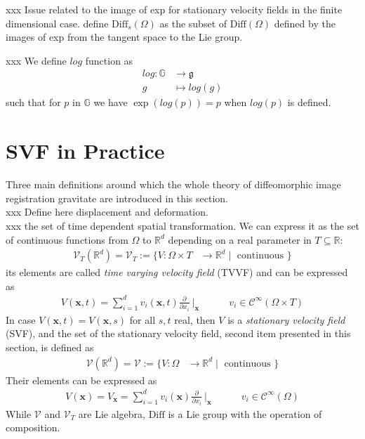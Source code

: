 xxx Issue related to the image of exp for stationary velocity fields in the finite dimensional case. define $\text{Diff}_{s}(\Omega)$ as the subset of $\text{Diff}(\Omega)$ defined by the images of exp from the tangent space to the Lie group.


xxx We define $log$ function as
\begin{align*}
log : \mathbb{G} & \longrightarrow  \mathfrak{g}    \\
g &\longmapsto log(g)
\end{align*}
such that for $p$ in $\mathbb{G}$ we have $\exp(log(p)) = p$ when $log(p)$ is defined.



\section{SVF in Practice}

Three main definitions around which the whole theory of diffeomorphic image registration gravitate are introduced in this section. \\
xxx Define here displacement and deformation.\\
xxx the set of time dependent spatial transformation. We can express it as the set of continuous functions from $\Omega$ to $\mathbb{R}^{d}$ depending on a real parameter in $T\subseteq \mathbb{R}$:
\begin{align*}
\mathcal{V}_{T}(\mathbb{R}^{d}) = \mathcal{V}_{T} := \lbrace V : \Omega \times T &\longrightarrow \mathbb{R}^d \mid \text{ continuous } \rbrace 
\end{align*}
its elements are called \emph{time varying velocity field} (TVVF) and can be expressed as
\begin{align*}
V(\mathbf{x},t) = \sum_{i=1}^{d} v_{i}(\mathbf{x},t) \frac{\partial}{\partial x_{i}}~\Bigr|_{\mathbf{x}} 
\qquad 
\quad 
v_{i} \in \mathcal{C}^{\infty} (\Omega \times T)
\end{align*}
In case $V(\mathbf{x},t) = V(\mathbf{x},s)$ for all $s,t$ real, then $V$ is a \emph{stationary velocity field} (SVF), and the set of the stationary velocity field, second item presented in this section, is defined as
\begin{align*}
\mathcal{V}(\mathbb{R}^{d}) = \mathcal{V} := \lbrace V : \Omega &\longrightarrow \mathbb{R}^d \mid \text{ continuous } \rbrace 
\end{align*}
Their elements can be expressed as 
\begin{align*}
V(\mathbf{x}) = V_{\mathbf{x}} = \sum_{i=1}^{d} v_{i}(\mathbf{x}) \frac{\partial}{\partial x_{i}}~\Bigr|_{\mathbf{x}} \qquad \quad v_{i} \in \mathcal{C}^{\infty} (\Omega)
\end{align*}
While $\mathcal{V}$ and $\mathcal{V}_{T}$ are Lie algebra, $\text{Diff}$ is a Lie group with the operation of composition.\\

